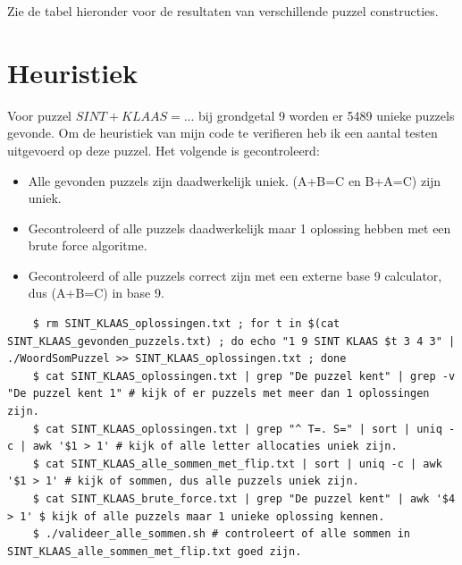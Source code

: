 \documentclass[twocolumn,10pt]{article}
\begin{document}
Zie de tabel hieronder voor de resultaten van verschillende puzzel constructies.
\begin{table}[h]
    \centering
    \caption{Resultaten van verschillende constructies.}
\end{table}
\FloatBarrier

\section*{Heuristiek}
Voor puzzel $SINT+KLAAS=...$ bij grondgetal 9 worden er 5489 unieke puzzels gevonde.
Om de heuristiek van mijn code te verifieren heb ik een aantal testen uitgevoerd op deze puzzel.
Het volgende is gecontroleerd:
\begin{itemize}
    \item Alle gevonden puzzels zijn daadwerkelijk uniek. (A+B=C en B+A=C) zijn uniek.
    \item Gecontroleerd of alle puzzels daadwerkelijk maar 1 oplossing hebben met een brute force algoritme.
    \item Gecontroleerd of alle puzzels correct zijn met een externe base 9 calculator, dus (A+B=C) in base 9.
\end{itemize}

\begin{lstlisting}
    $ rm SINT_KLAAS_oplossingen.txt ; for t in $(cat SINT_KLAAS_gevonden_puzzels.txt) ; do echo "1 9 SINT KLAAS $t 3 4 3" | ./WoordSomPuzzel >> SINT_KLAAS_oplossingen.txt ; done
    $ cat SINT_KLAAS_oplossingen.txt | grep "De puzzel kent" | grep -v "De puzzel kent 1" # kijk of er puzzels met meer dan 1 oplossingen zijn.
    $ cat SINT_KLAAS_oplossingen.txt | grep "^ T=. S=" | sort | uniq -c | awk '$1 > 1' # kijk of alle letter allocaties uniek zijn.
    $ cat SINT_KLAAS_alle_sommen_met_flip.txt | sort | uniq -c | awk '$1 > 1' # kijk of sommen, dus alle puzzels uniek zijn.
    $ cat SINT_KLAAS_brute_force.txt | grep "De puzzel kent" | awk '$4 > 1' $ kijk of alle puzzels maar 1 unieke oplossing kennen.
    $ ./valideer_alle_sommen.sh # controleert of alle sommen in SINT_KLAAS_alle_sommen_met_flip.txt goed zijn.
\end{lstlisting}
\end{document}
